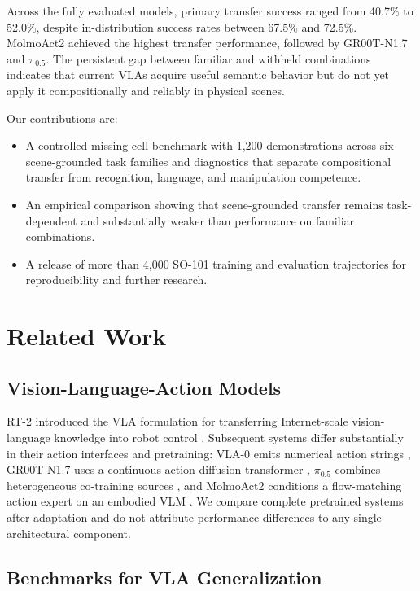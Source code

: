 \documentclass[conference]{IEEEtran}
\begin{document}
Across the fully evaluated models, primary transfer success ranged from 40.7\% to 52.0\%, despite in-distribution success rates between 67.5\% and 72.5\%. MolmoAct2 achieved the highest transfer performance, followed by GR00T-N1.7 and $\pi_{0.5}$. The persistent gap between familiar and withheld combinations indicates that current VLAs acquire useful semantic behavior but do not yet apply it compositionally and reliably in physical scenes.

Our contributions are:
\begin{itemize}
    \item A controlled missing-cell benchmark with 1,200 demonstrations across six scene-grounded task families and diagnostics that separate compositional transfer from recognition, language, and manipulation competence.
    \item An empirical comparison showing that scene-grounded transfer remains task-dependent and substantially weaker than performance on familiar combinations.
    \item A release of more than 4,000 SO-101 training and evaluation trajectories for reproducibility and further research.
\end{itemize}

\section{Related Work}

\subsection{Vision-Language-Action Models}

RT-2 introduced the VLA formulation for transferring Internet-scale
vision-language knowledge into robot control \cite{brohan2023rt2}.
Subsequent systems differ substantially in their action interfaces and
pretraining: VLA-0 emits numerical action strings
\cite{goyal2025vla0}, GR00T-N1.7 uses a continuous-action diffusion
transformer \cite{nvidia2025grootn1}, $\pi_{0.5}$ combines heterogeneous
co-training sources \cite{black2025pi05}, and MolmoAct2 conditions a
flow-matching action expert on an embodied VLM
\cite{fang2026molmoact2}. We compare complete pretrained systems after
adaptation and do not attribute performance differences to any single
architectural component.

\subsection{Benchmarks for VLA Generalization}
\end{document}
